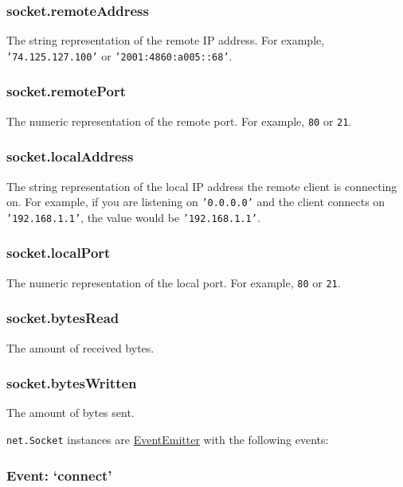 \subsubsection{socket.remoteAddress}

The string representation of the remote IP address. For example,
\texttt{'74.125.127.100'} or \texttt{'2001:4860:a005::68'}.

\subsubsection{socket.remotePort}

The numeric representation of the remote port. For example, \texttt{80}
or \texttt{21}.

\subsubsection{socket.localAddress}

The string representation of the local IP address the remote client is
connecting on. For example, if you are listening on \texttt{'0.0.0.0'}
and the client connects on \texttt{'192.168.1.1'}, the value would be
\texttt{'192.168.1.1'}.

\subsubsection{socket.localPort}

The numeric representation of the local port. For example, \texttt{80}
or \texttt{21}.

\subsubsection{socket.bytesRead}

The amount of received bytes.

\subsubsection{socket.bytesWritten}

The amount of bytes sent.

\texttt{net.Socket} instances are
\href{events.html\#events\_class\_events\_eventemitter}{EventEmitter}
with the following events:

\subsubsection{Event: `connect'}

